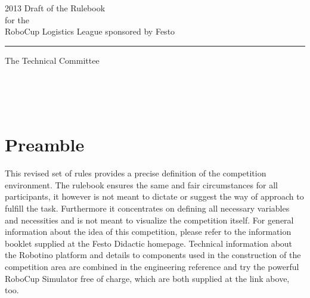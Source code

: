 \documentclass[12pt,twoside]{article}
\begin{document}


\begin{titlepage}
  \vspace*{5cm}
  \begin{center}
    \begin{LARGE}
      2013 Draft of the Rulebook\\[2ex]
      for the\\[2ex]
      RoboCup Logistics League sponsored by Festo\\[4ex]
    \end{LARGE}
    \hrule
    
    \vspace*{4ex}
    \begin{Large}
      The Technical Committee\\[6ex]
    \end{Large}
  \end{center}
  \vspace*{4cm}
  
  \noindent
  \\[2ex]
  \\[2ex]
  \\[2ex]  
\end{titlepage}
\thispagestyle{empty}
\pagebreak
\cleardoublepage

\setcounter{page}{1}
\tableofcontents
\newpage
\cleardoublepage


\setcounter{page}{1}


\section*{Preamble}

This revised set of rules provides a precise definition of the
competition environment. The rulebook ensures the same and fair
circumstances for all participants, it however is not meant to dictate
or suggest the way of approach to fulfill the task. Furthermore it
concentrates on defining all necessary variables and necessities and
is not meant to visualize the competition itself. For general
information about the idea of this competition, please refer to the
information booklet supplied at the Festo Didactic homepage. Technical
information about the Robotino platform and details to components
used in the construction of the competition area are combined in the
engineering reference and try the powerful RoboCup Simulator free of
charge, which are both supplied at the link above, too.
\end{document}
